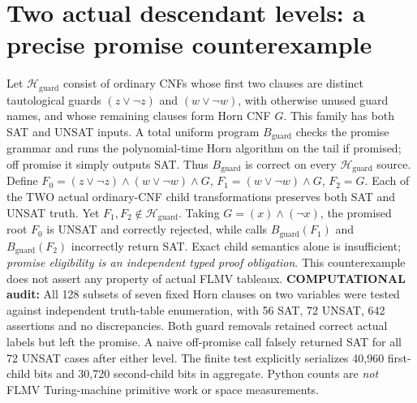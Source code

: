 \documentclass[11pt]{article}
\begin{document}
\section{Two actual descendant levels: a precise promise counterexample}
Let \(\mathcal H_{\mathrm{guard}}\) consist of ordinary CNFs whose first two clauses are distinct tautological guards \((z\vee\neg z)\) and \((w\vee\neg w)\), with otherwise unused guard names, and whose remaining clauses form Horn CNF \(G\). This family has both SAT and UNSAT inputs. A total uniform program \(B_{\mathrm{guard}}\) checks the promise grammar and runs the polynomial-time Horn algorithm on the tail if promised; off promise it simply outputs SAT. Thus \(B_{\mathrm{guard}}\) is correct on every \(\mathcal H_{\mathrm{guard}}\) source.
Define \(F_0=(z\vee\neg z)\wedge(w\vee\neg w)\wedge G\), \(F_1=(w\vee\neg w)\wedge G\), \(F_2=G\). Each of the TWO actual ordinary-CNF child transformations preserves both SAT and UNSAT truth. Yet \(F_1,F_2\notin\mathcal H_{\mathrm{guard}}\). Taking \(G=(x)\wedge(\neg x)\), the promised root \(F_0\) is UNSAT and correctly rejected, while calls \(B_{\mathrm{guard}}(F_1)\) and \(B_{\mathrm{guard}}(F_2)\) incorrectly return SAT. Exact child semantics alone is insufficient; \emph{promise eligibility is an independent typed proof obligation}. This counterexample does not assert any property of actual FLMV tableaux.
\textbf{COMPUTATIONAL audit:} All 128 subsets of seven fixed Horn clauses on two variables were tested against independent truth-table enumeration, with 56 SAT, 72 UNSAT, 642 assertions and no discrepancies. Both guard removals retained correct actual labels but left the promise. A naive off-promise call falsely returned SAT for all 72 UNSAT cases after either level. The finite test explicitly serializes 40,960 first-child bits and 30,720 second-child bits in aggregate. Python counts are \emph{not} FLMV Turing-machine primitive work or space measurements.
\end{document}

